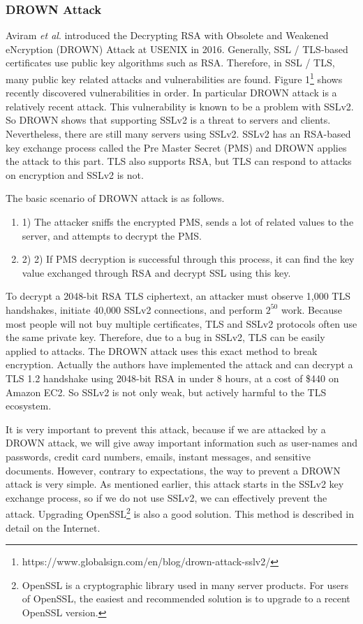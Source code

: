 \documentclass[a4paper]{article}
\begin{document}
\subsubsection*{DROWN Attack}
Aviram \textit{et al}.\cite{drown} introduced the Decrypting RSA with Obsolete and Weakened eNcryption (DROWN)  Attack at USENIX in 2016. Generally, SSL / TLS-based certificates use public key algorithms such as RSA. Therefore, in SSL / TLS, many public key related attacks and vulnerabilities are found. Figure 1\footnote{https://www.globalsign.com/en/blog/drown-attack-sslv2/} shows recently discovered vulnerabilities in order. In particular DROWN attack is a relatively recent attack. This vulnerability is known to be a problem with SSLv2. So DROWN shows that supporting SSLv2 is a threat to servers and clients. Nevertheless, there are still many servers using SSLv2. SSLv2 has an RSA-based key exchange process called the Pre Master Secret (PMS) and DROWN applies the attack to this part. TLS also supports RSA, but TLS can respond to attacks on encryption and SSLv2 is not.

The basic scenario of DROWN attack is as follows. 
\begin{enumerate}[label=]
      \item 1) The attacker sniffs the encrypted PMS, sends a lot of related values to the server, and attempts to decrypt the PMS.
      
      \item 2) 2) If PMS decryption is successful through this process, it can find the key value exchanged through RSA and decrypt SSL using this key.
\end{enumerate}  

To decrypt a 2048-bit RSA TLS ciphertext, an attacker must observe 1,000 TLS handshakes, initiate 40,000 SSLv2 connections, and perform $2^{50}$ work. Because most people will not buy multiple certificates, TLS and SSLv2 protocols often use the same private key. Therefore, due to a bug in SSLv2, TLS can be easily applied to attacks. The DROWN attack uses this exact method to break encryption. Actually the authors have implemented the attack and can decrypt a TLS 1.2 handshake using 2048-bit RSA in under 8 hours, at a cost of \$440 on Amazon EC2. So SSLv2 is not only weak, but actively harmful to the TLS ecosystem.

It is very important to prevent this attack, because if we are attacked by a DROWN attack, we will give away important information such as user-names and passwords, credit card numbers, emails, instant messages, and sensitive documents. However, contrary to expectations, the way to prevent a DROWN attack is very simple. As mentioned earlier, this attack starts in the SSLv2 key exchange process, so if we do not use SSLv2, we can effectively prevent the attack. Upgrading OpenSSL\footnote{OpenSSL is a cryptographic library used in many server products. For users of OpenSSL, the easiest and recommended solution is to upgrade to a recent OpenSSL version.} is also a good solution. This method \cite{Openssl} is described in detail on the Internet.
\end{document}
